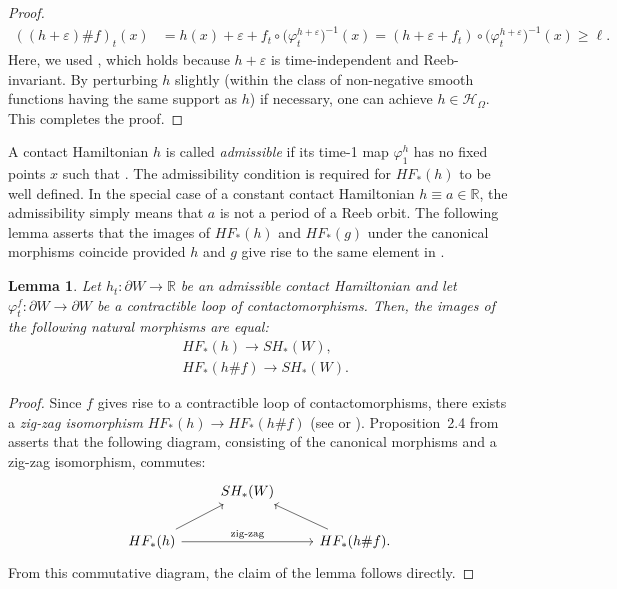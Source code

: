 \documentclass[10pt,a4paper]{amsart}
\numberwithin{equation}{section}
\newtheorem{Lemma}[Theorem]{Lemma}
\theoremstyle{definition}
\begin{document}
\begin{proof}
\begin{align*}
((h + \varepsilon)\# f)_t(x) &= h(x) +\varepsilon + f_t\circ\bigl(\varphi^{h+\varepsilon}_t\bigr)^{-1}(x) = (h +\varepsilon + f_t)\circ\bigl(\varphi^{h+\varepsilon}_t\bigr)^{-1}(x) \geqslant \ell.
\end{align*}
Here, we used , which holds because $h+\varepsilon$ is time-independent and Reeb-invariant. By perturbing $h$ slightly {(within the class of non-negative smooth functions having the same support as $h$)} if necessary, one can achieve $h\in\mathcal{H}_\Omega$. This completes the proof.
\end{proof}

A contact Hamiltonian $h$ is called \emph{admissible}\label{def:admissible} if its time-1 map $\varphi^h_1$ has no fixed points $x$ such that . The admissibility condition is required for $HF_\ast(h)$ to be well defined. In the special case of a constant contact Hamiltonian $h\equiv a\in \mathbb{R}$, the admissibility simply means that $a$ is not a period of a Reeb orbit.
The following lemma asserts that the images of $HF_\ast(h)$ and $HF_\ast(g)$ under the canonical morphisms coincide provided $h$ and $g$ give rise to the same element in .

\begin{Lemma}\label{lem:compwithcontractible}
Let $h_t\colon \partial W\to \mathbb{R}$ be an admissible contact Hamiltonian and let $\varphi^f_t\colon \partial W\to\partial W$ be a contractible loop of contactomorphisms. Then, the images of the following natural morphisms are equal:
\begin{align*}
& HF_\ast(h)\to SH_\ast(W),\\
& HF_\ast(h\#f)\to SH_\ast(W).
\end{align*}
\end{Lemma}
\begin{proof}
Since $f$ gives rise to a contractible loop of contactomorphisms, there exists a {\emph{zig-zag isomorphism}} $HF_\ast(h)\to HF_\ast(h\# f)$ (see \cite[Section~9]{uljarevic2023selective} or \cite[Section~2.1.3]{djordjevic2025quantitative}). Proposition~2.4 from \cite{djordjevic2025quantitative} asserts that the following diagram, consisting of the canonical morphisms and a zig-zag isomorphism, commutes:
\[\begin{tikzcd}
&SH_\ast(W)&\\
HF_\ast(h)\arrow["\text{zig-zag}"]{rr}\arrow{ru}&&HF_\ast(h\#f).\arrow{lu}
\end{tikzcd}\]
From this commutative diagram, the claim of the lemma follows directly.
\end{proof}
\end{document}
